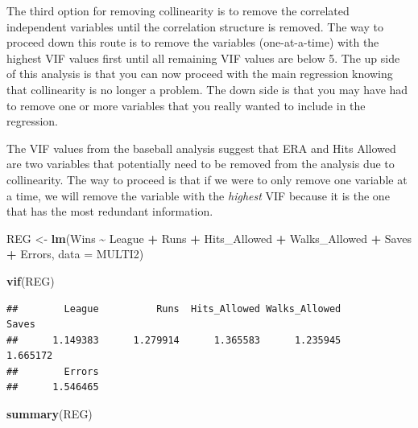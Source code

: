 \documentclass[
]{book}
\newenvironment{Shaded}{\begin{snugshade}}{\end{snugshade}}
\newcommand{\AttributeTok}[1]{\textcolor[rgb]{0.13,0.29,0.53}{#1}}
\newcommand{\FunctionTok}[1]{\textcolor[rgb]{0.13,0.29,0.53}{\textbf{#1}}}
\newcommand{\NormalTok}[1]{#1}
\newcommand{\OtherTok}[1]{\textcolor[rgb]{0.56,0.35,0.01}{#1}}
\newcommand{\SpecialCharTok}[1]{\textcolor[rgb]{0.81,0.36,0.00}{\textbf{#1}}}
\begin{document}
The third option for removing collinearity is to remove the correlated independent variables until the correlation structure is removed. The way to proceed down this route is to remove the variables (one-at-a-time) with the highest VIF values first until all remaining VIF values are below 5. The up side of this analysis is that you can now proceed with the main regression knowing that collinearity is no longer a problem. The down side is that you may have had to remove one or more variables that you really wanted to include in the regression.

The VIF values from the baseball analysis suggest that ERA and Hits Allowed are two variables that potentially need to be removed from the analysis due to collinearity. The way to proceed is that if we were to only remove one variable at a time, we will remove the variable with the \emph{highest} VIF because it is the one that has the most redundant information.

\begin{Shaded}
\begin{Highlighting}[]
\NormalTok{REG }\OtherTok{\textless{}{-}} \FunctionTok{lm}\NormalTok{(Wins }\SpecialCharTok{\textasciitilde{}}\NormalTok{ League }\SpecialCharTok{+}\NormalTok{ Runs }\SpecialCharTok{+}\NormalTok{ Hits\_Allowed }\SpecialCharTok{+}\NormalTok{ Walks\_Allowed }\SpecialCharTok{+}\NormalTok{ Saves }\SpecialCharTok{+}\NormalTok{ Errors, }\AttributeTok{data =}\NormalTok{ MULTI2)}

\FunctionTok{vif}\NormalTok{(REG)}
\end{Highlighting}
\end{Shaded}

\begin{verbatim}
##        League          Runs  Hits_Allowed Walks_Allowed         Saves 
##      1.149383      1.279914      1.365583      1.235945      1.665172 
##        Errors 
##      1.546465
\end{verbatim}

\begin{Shaded}
\begin{Highlighting}[]
\FunctionTok{summary}\NormalTok{(REG)}
\end{Highlighting}
\end{Shaded}
\end{document}
